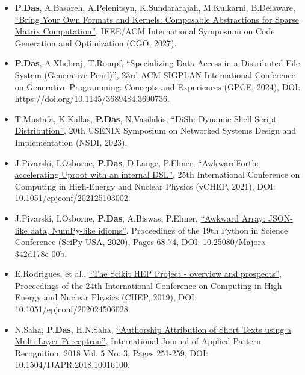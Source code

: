\documentclass[10pt, letterpaper]{article}
\newenvironment{tightitemize}
    {\begin{itemize}[topsep=0pt, partopsep=0pt, parsep=0pt, itemsep=1pt]}
    {\end{itemize}}
\begin{document}
\begin{tightitemize}
\item \textbf{P.Das}, A.Basareh, A.Pelenitsyn, K.Sundararajah, M.Kulkarni, B.Delaware, {\href{https://arxiv.org/abs/2407.00829}{``Bring Your Own Formats and Kernels: Composable Abstractions for Sparse Matrix Computation''}}, IEEE/ACM International Symposium on Code Generation and Optimization (CGO, 2027).
\item \textbf{P.Das}, A.Xhebraj, T.Rompf, {\href{https://www.cs.purdue.edu/homes/rompf/papers/das-gpce24.pdf}{``Specializing Data Access in a Distributed File System (Generative Pearl)''}}, 23rd ACM SIGPLAN International Conference on Generative Programming: Concepts and Experiences (GPCE, 2024), DOI: https://doi.org/10.1145/3689484.3690736.
\item T.Mustafa, K.Kallas, \textbf{P.Das}, N.Vasilakis, {\href{https://www.usenix.org/conference/nsdi23/presentation/mustafa}{``DiSh: Dynamic Shell-Script Distribution''}}, 20th USENIX Symposium on Networked Systems Design and Implementation (NSDI, 2023).
\item J.Pivarski, I.Osborne, {\textbf{P.Das}}, D.Lange, P.Elmer, {\href{https://www.epj-conferences.org/articles/epjconf/abs/2021/05/epjconf_chep2021_03002/epjconf_chep2021_03002.html}{``AwkwardForth: accelerating Uproot with an internal DSL''}}, 25th International Conference on Computing in High-Energy and Nuclear Physics (vCHEP, 2021), DOI: 10.1051/epjconf/202125103002.
\item J.Pivarski, I.Osborne, {\textbf{P.Das}}, A.Biswas, P.Elmer, {\href{http://conference.scipy.org/proceedings/scipy2020/jim_pivarski.html}{``Awkward Array: JSON-like data, NumPy-like idioms''}}, Proceedings of the 19th Python in Science Conference (SciPy USA, 2020), Pages 68-74, DOI: 10.25080/Majora-342d178e-00b.
\item E.Rodrigues, et al., {\href{https://www.epj-conferences.org/articles/epjconf/abs/2020/21/epjconf_chep2020_06028/epjconf_chep2020_06028.html}{``The Scikit HEP Project - overview and prospects''}}, Proceedings of the 24th International Conference on Computing in High Energy and Nuclear Physics (CHEP, 2019), DOI: 10.1051/epjconf/202024506028.
\item N.Saha, {\textbf{P.Das}}, H.N.Saha, {\href{https://www.inderscienceonline.com/doi/abs/10.1504/IJAPR.2018.094819}{``Authorship Attribution of Short Texts using a Multi Layer Perceptron''}}, International Journal of Applied Pattern Recognition, 2018 Vol. 5 No. 3, Pages 251-259, DOI: 10.1504/IJAPR.2018.10016100.
\end{tightitemize}
\end{document}
